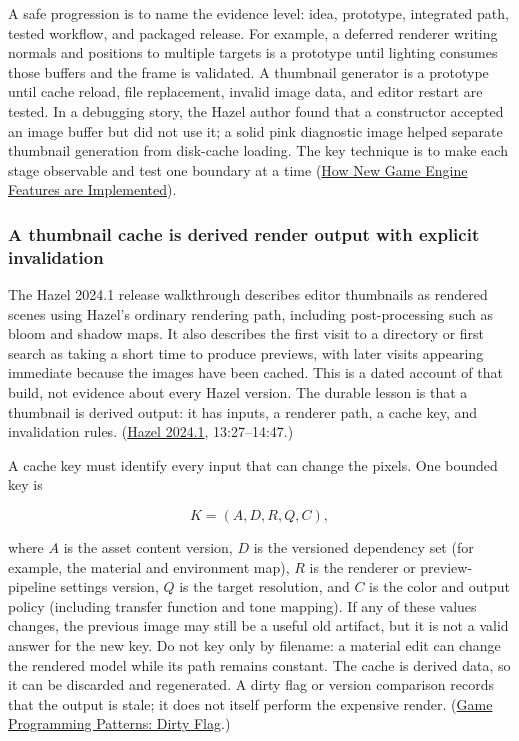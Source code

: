 A safe progression is to name the evidence level: idea, prototype, integrated path, tested workflow, and packaged release. For example, a deferred renderer writing normals and positions to multiple targets is a prototype until lighting consumes those buffers and the frame is validated. A thumbnail generator is a prototype until cache reload, file replacement, invalid image data, and editor restart are tested. In a debugging story, the Hazel author found that a constructor accepted an image buffer but did not use it; a solid pink diagnostic image helped separate thumbnail generation from disk-cache loading. The key technique is to make each stage observable and test one boundary at a time (\href{https://www.youtube.com/watch?v=z1O6AZWuWm4&t=13m56s}{How New Game Engine Features are Implemented}).

\subsubsection{A thumbnail cache is derived render output with explicit invalidation}\label{a-thumbnail-cache-is-derived-render-output-with-explicit-invalidation}

The Hazel 2024.1 release walkthrough describes editor thumbnails as rendered scenes using Hazel's ordinary rendering path, including post-processing such as bloom and shadow maps. It also describes the first visit to a directory or first search as taking a short time to produce previews, with later visits appearing immediate because the images have been cached. This is a dated account of that build, not evidence about every Hazel version. The durable lesson is that a thumbnail is derived output: it has inputs, a renderer path, a cache key, and invalidation rules. (\href{https://www.youtube.com/watch?v=10OVd1VHEZ4&t=13m27s}{Hazel 2024.1}, 13:27--14:47.)

A cache key must identify every input that can change the pixels. One bounded key is

\[
K=(A,D,R,Q,C),
\]

where \(A\) is the asset content version, \(D\) is the versioned dependency set (for example, the material and environment map), \(R\) is the renderer or preview-pipeline settings version, \(Q\) is the target resolution, and \(C\) is the color and output policy (including transfer function and tone mapping). If any of these values changes, the previous image may still be a useful old artifact, but it is not a valid answer for the new key. Do not key only by filename: a material edit can change the rendered model while its path remains constant. The cache is derived data, so it can be discarded and regenerated. A dirty flag or version comparison records that the output is stale; it does not itself perform the expensive render. (\href{https://github.com/munificent/game-programming-patterns/blob/master/book/dirty-flag.markdown}{Game Programming Patterns: Dirty Flag}.)

